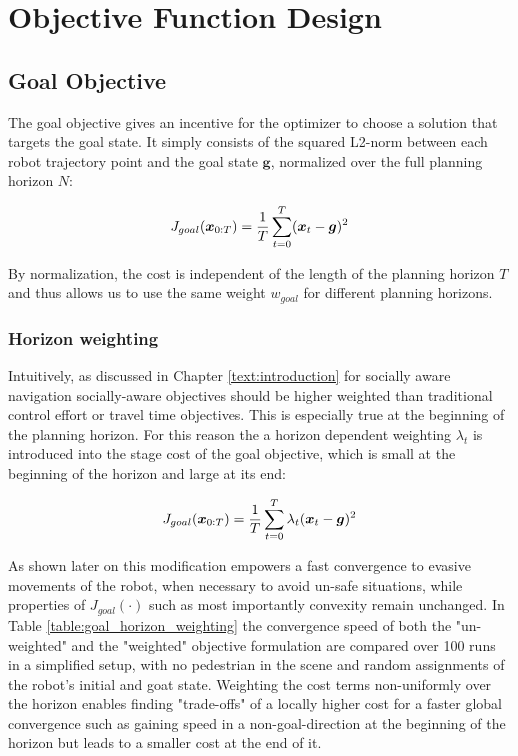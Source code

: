 \section{Objective Function Design}
\label{text:approach/objective}

\subsection{Goal Objective}
\label{text:approach/objective/goal}
The goal objective gives an incentive for the optimizer to choose a solution that targets the goal state. It simply consists of the squared L2-norm between each robot trajectory point and the goal state $\boldsymbol{g}$, normalized over the full planning horizon $N$:

\begin{equation}
J_{goal}(\boldsymbol{x}_{0:T}) = \frac{1}{T} \sum_{t = 0}^T (\boldsymbol{x}_t - \boldsymbol{g})^2
\label{eq:goal_unweighted}
\end{equation}

By normalization, the cost is independent of the length of the planning horizon $T$ and thus allows us to use the same weight $w_{goal}$ for different planning horizons.

\subsubsection{Horizon weighting}
Intuitively, as discussed in Chapter \ref{text:introduction} for socially aware navigation socially-aware objectives should be higher weighted than traditional control effort or travel time objectives. This is especially true at the beginning of the planning horizon. For this reason the a horizon dependent weighting $\lambda_t$ is introduced into the stage cost of the goal objective, which is small at the beginning of the horizon and large at its end: 

\begin{equation}
J_{goal}(\boldsymbol{x}_{0:T}) = \frac{1}{T} \sum_{t = 0}^T \lambda_t (\boldsymbol{x}_t - \boldsymbol{g})^2
\label{eq:goal_weighted}
\end{equation}

As shown later on this modification empowers a fast convergence to evasive movements of the robot, when necessary to avoid un-safe situations, while properties of $J_{goal}(\cdot)$ such as most importantly convexity remain unchanged. In Table \ref{table:goal_horizon_weighting} the convergence speed of both the "un-weighted" and the "weighted" objective formulation are compared over 100 runs in a simplified setup, with no pedestrian in the scene and random assignments of the robot's initial and goat state. Weighting the cost terms non-uniformly over the horizon enables finding "trade-offs" of a locally higher cost for a faster global convergence such as gaining speed in a non-goal-direction at the beginning of the horizon but leads to a smaller cost at the end of it. 

